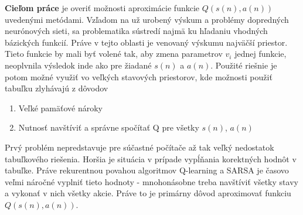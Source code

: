 {\bf Cieľom práce} je overiť možnosti aproximácie funkcie $Q(s(n), a(n))$
uvedenými metódami. Vzľadom na už urobený výskum a problémy dopredných
neurónových sieti, sa problematika sústredí najmä
ku hľadaniu vhodných bázických funkcií. Práve v tejto oblasti je venovaný výskumu
najväčší priestor. Tieto funkcie by mali byť volené tak, aby zmena parametrov $v_i$ jednej
funkcie, neoplvnila výsledok inde ako pre žiadané $s(n)$ a $a(n)$.
Použité riešnie je potom možné využiť vo veľkých stavových priestorov, kde možnosti použiť tabuľku
zlyhávajú z dôvodov
\begin{enumerate}
  \item Veľké pamäťové nároky
  \item Nutnosť navštíviť a správne spočítať Q pre všetky $s(n)$, $a(n)$
\end{enumerate}
Prvý problém nepredstavuje pre súčastné počítače až tak veľký nedostatok tabuľkového
riešenia. Horšia je situácia v prípade vypĺňania korektných hodnôt v tabuľke. Práve rekurentnou
povahou algoritmov Q-learning a SARSA je časovo veľmi náročné vyplniť tieto hodnoty -
mnohonásobne treba navštíviť všetky stavy a vykonať v nich všetky akcie. Práve to je
primárny dôvod aproximovať funkciu $Q(s(n), a(n))$.
